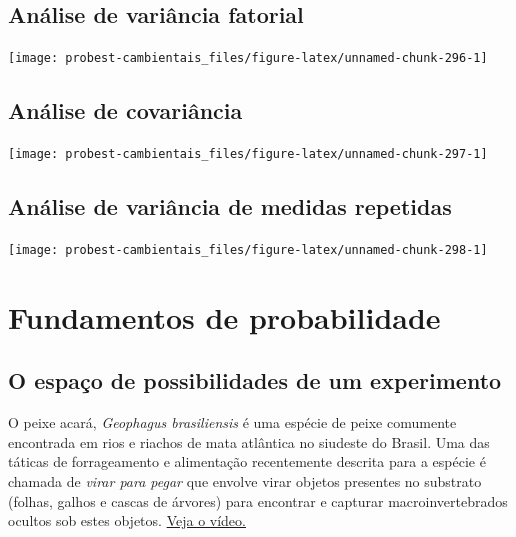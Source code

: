 \documentclass[
]{book}
\begin{document}
\hypertarget{anovafatorial}{%
\chapter{Análise de variância fatorial}\label{anovafatorial}}

\begin{center}\texttt{[image: probest-cambientais\_files/figure-latex/unnamed-chunk-296-1]} \end{center}

\hypertarget{ancova}{%
\chapter{Análise de covariância}\label{ancova}}

\begin{center}\texttt{[image: probest-cambientais\_files/figure-latex/unnamed-chunk-297-1]} \end{center}

\hypertarget{repanova}{%
\chapter{Análise de variância de medidas repetidas}\label{repanova}}

\begin{center}\texttt{[image: probest-cambientais\_files/figure-latex/unnamed-chunk-298-1]} \end{center}

\hypertarget{part-fundamentos-de-probabilidade}{%
\part{Fundamentos de probabilidade}\label{part-fundamentos-de-probabilidade}}

\hypertarget{espacoamostral}{%
\chapter{O espaço de possibilidades de um experimento}\label{espacoamostral}}

O peixe acará, \emph{Geophagus brasiliensis} é uma espécie de peixe comumente encontrada em rios e riachos de mata atlântica no siudeste do Brasil. Uma das táticas de forrageamento e alimentação recentemente descrita para a espécie é chamada de \emph{virar para pegar} \citep{souza2019surprising} que envolve virar objetos presentes no substrato (folhas, galhos e cascas de árvores) para encontrar e capturar macroinvertebrados ocultos sob estes objetos. \href{https://www.scielo.br/img/revistas/bn/v19n3/1676-0611-bn-19-03-e20180702-suppl1.mp4}{Veja o vídeo.}
\end{document}
